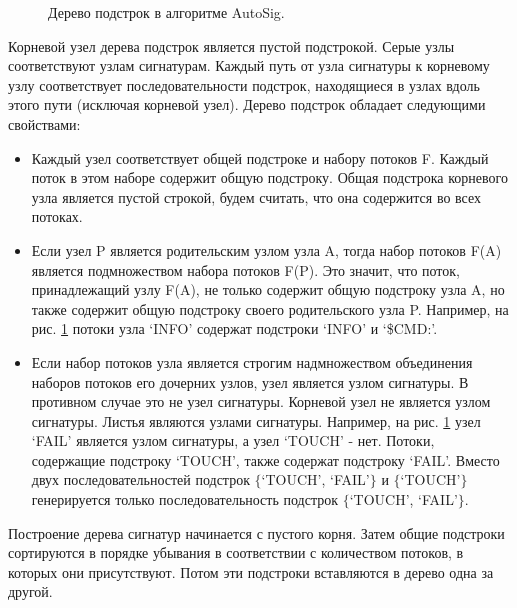 \begin{figure}[H]
    \begin{center}
        
        \caption{Дерево подстрок в алгоритме AutoSig.}\label{autosig:tree}
    \end{center}
\end{figure}

Корневой узел дерева подстрок является пустой подстрокой. Серые узлы соответствуют узлам сигнатурам.
Каждый путь от узла сигнатуры к корневому узлу соответствует последовательности подстрок,
находящиеся в узлах вдоль этого пути (исключая корневой узел).
Дерево подстрок обладает следующими свойствами:

\begin{itemize}
    \item Каждый узел соответствует общей подстроке и набору потоков F.
    Каждый поток в этом наборе содержит общую подстроку.
    Общая подстрока корневого узла является пустой строкой, будем считать, что она содержится во всех потоках.

    \item Если узел P является родительским узлом узла A, тогда набор потоков F(A) является подмножеством набора потоков F(P).
    Это значит, что поток, принадлежащий узлу F(A), не только содержит общую подстроку узла A, но также содержит общую подстроку своего родительского узла P.
    Например, на рис. \ref{autosig:tree} потоки узла `INFO' содержат подстроки `INFO' и `\$CMD:'.

    \item Если набор потоков узла является строгим надмножеством объединения наборов потоков его дочерних узлов, узел является узлом сигнатуры.
    В противном случае это не узел сигнатуры. Корневой узел не является узлом сигнатуры. Листья являются узлами сигнатуры.
    Например, на рис. \ref{autosig:tree} узел `FAIL' является узлом сигнатуры, а узел `TOUCH' - нет.
    Потоки, содержащие подстроку `TOUCH', также содержат подстроку `FAIL'.
    Вместо двух последовательностей подстрок $\{$`TOUCH', `FAIL'$\}$ и $\{$`TOUCH'$\}$
    генерируется только последовательность подстрок $\{$`TOUCH', `FAIL'$\}$.

\end{itemize}

Построение дерева сигнатур начинается с пустого корня.
Затем общие подстроки сортируются в порядке убывания в соответствии с количеством потоков, в которых они присутствуют.
Потом эти подстроки вставляются в дерево одна за другой.

